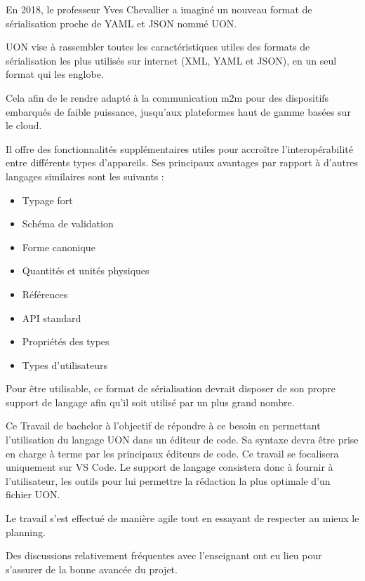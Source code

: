 
En 2018, le professeur Yves Chevallier a imaginé un nouveau format de sérialisation proche de YAML et JSON nommé UON.

UON vise à rassembler toutes les caractéristiques utiles des formats de sérialisation les plus utilisés sur internet (XML, YAML et JSON),
en un seul format qui les englobe.

Cela afin de le rendre adapté à la communication \Gls{m2m} pour des dispositifs embarqués de faible puissance, jusqu'aux plateformes haut de gamme basées sur le cloud.

Il offre des fonctionnalités supplémentaires utiles pour accroître l'interopérabilité entre différents types d'appareils. Ses principaux avantages par rapport à d'autres langages similaires sont les suivants :

\begin{itemize}
    \item Typage fort
    \item Schéma de validation
    \item Forme canonique
    \item Quantités et unités physiques
    \item Références
    \item API standard
    \item Propriétés des types
    \item Types d'utilisateurs
\end{itemize}

Pour être utilisable, ce format de sérialisation devrait disposer de son propre support de langage afin qu'il soit utilisé par un plus grand nombre.

Ce Travail de bachelor à l'objectif de répondre à ce besoin en permettant l'utilisation du langage UON dans un éditeur de code.
Sa syntaxe devra être prise en charge à terme par les principaux éditeurs de code. Ce travail se focalisera uniquement sur VS Code.
Le support de langage consistera donc à fournir à l'utilisateur, les outils pour lui permettre la rédaction la plus optimale d'un fichier UON.

Le travail s'est effectué de manière agile tout en essayant de respecter au mieux le planning.

Des discussions relativement fréquentes avec l'enseignant ont eu lieu pour s'assurer de la bonne avancée du projet.

